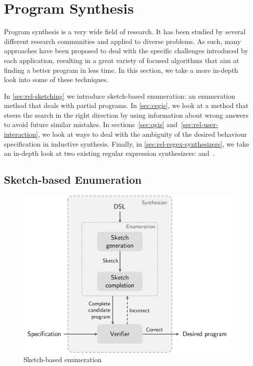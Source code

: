 \chapter{Program Synthesis}\label{chap:program-synthesis}


Program synthesis is a very wide field of research. It has been studied by several different research communities and applied to diverse problems. As such, many approaches have been proposed to deal with the specific challenges introduced by each application, resulting in a great variety of focused algorithms that aim at finding a better program in less time. In this section, we take a more in-depth look into some of these techniques.

In \autoref{sec:rel-sketching} we introduce sketch-based enumeration: an enumeration method that deals with partial programs. In \autoref{sec:cegis}, we look at a method that steers the search in the right direction by using information about wrong answers to avoid future similar mistakes.
%
In sections~\ref{sec:ogis} and~\ref{sec:rel-user-interaction}, we look at ways to deal with the ambiguity of the desired behaviour specification in inductive synthesis.
%
Finally, in \autoref{sec:rel-regex-synthesizers}, we take an in-depth look at two existing regular expression synthesizers: \AlphaRegex and~\Regel.

\section{Sketch-based Enumeration}\label{sec:rel-sketching}

\begin{figure}
    \centering
    \includegraphics[scale=.35]{pictures/sketch.pdf}
    \caption{Sketch-based enumeration}
    \label{fig:sketch_enumeration}
\end{figure}

